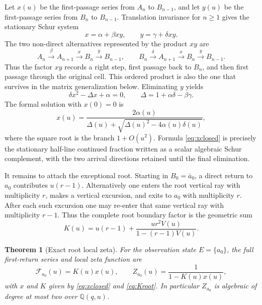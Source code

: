 \documentclass[11pt,reqno]{amsart}
\numberwithin{equation}{section}
\newtheorem{theorem}{Theorem}[section]
\theoremstyle{definition}
\theoremstyle{remark}
\newcommand{\cF}{\mathcal F}
\begin{document}
Let $x(u)$ be the first-passage series from $A_n$ to $B_{n-1}$, and let $y(u)$
be the first-passage series from $B_n$ to $B_{n-1}$.  Translation invariance
for $n\ge1$ gives the stationary Schur system
\begin{equation}\label{eq:xy-system}
 x=\alpha+\beta xy,
 \qquad
 y=\gamma+\delta xy.
\end{equation}
The two non-direct alternatives represented by the product $xy$ are
\[
 A_n\xrightarrow{\beta}A_{n+1}\xrightarrow{x}B_n
     \xrightarrow{y}B_{n-1},
 \qquad
 B_n\xrightarrow{\delta}A_{n+1}\xrightarrow{x}B_n
     \xrightarrow{y}B_{n-1}.
\]
Thus the factor $xy$ records a right step, first passage back to $B_n$, and
then first passage through the original cell.  This ordered product is also
the one that survives in the matrix generalization below.  Eliminating $y$
yields
\begin{equation}\label{eq:xquadratic}
 \delta x^2-\Delta x+\alpha=0,
 \qquad
 \Delta=1+\alpha\delta-\beta\gamma.
\end{equation}
The formal solution with $x(0)=0$ is
\begin{equation}\label{eq:xclosed}
 x(u)=\frac{2\alpha(u)}
 {\Delta(u)+\sqrt{\Delta(u)^2-4\alpha(u)\delta(u)}},
\end{equation}
where the square root is the branch $1+O(u^2)$.  Formula
\eqref{eq:xclosed} is precisely the stationary half-line continued fraction
written as a scalar algebraic Schur complement, with the two arrival directions
retained until the final elimination.

It remains to attach the exceptional root.  Starting in $B_0=\bar a_0$, a
direct return to $a_0$ contributes $u(r-1)$.  Alternatively one enters the
root vertical ray with multiplicity $r$, makes a vertical excursion, and exits
to $a_0$ with multiplicity $r$.  After each such excursion one may re-enter
that same vertical ray with multiplicity $r-1$.  Thus the complete root boundary
factor is the geometric sum
\begin{equation}\label{eq:Kroot}
 K(u)=u(r-1)+\frac{ur^2V(u)}{1-(r-1)V(u)}.
\end{equation}

\begin{theorem}[Exact root local zeta]\label{thm:algebraiclocal}
For the observation state $E=\{a_0\}$, the full first-return series and local
zeta function are
\begin{equation}\label{eq:exactFZ}
 \cF_{a_0}(u)=K(u)x(u),
 \qquad
 Z_{a_0}(u)=\frac1{1-K(u)x(u)},
\end{equation}
with $x$ and $K$ given by \eqref{eq:xclosed} and \eqref{eq:Kroot}.  In
particular $Z_{a_0}$ is algebraic of degree at most two over
$\mathbb Q(q,u)$.
\end{theorem}
\end{document}
